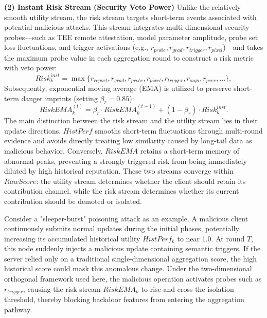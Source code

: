 \documentclass[runningheads,orivec]{llncs}
\begin{document}
\textbf{(2) Instant Risk Stream (Security Veto Power)}
Unlike the relatively smooth utility stream, the risk stream targets short-term events associated with potential malicious attacks. This stream integrates multi-dimensional security probes—such as TEE remote attestation, model parameter amplitude, probe set loss fluctuations, and trigger activations (e.g., $r_{probe}, r_{grad}, r_{trigger}, r_{pixel}$)—and takes the maximum probe value in each aggregation round to construct a risk metric with veto power:
\begin{equation}
    Risk_{k}^{inst} = \max\{r_{report}, r_{grad}, r_{probe}, r_{pixel}, r_{trigger}, r_{sign}, r_{peer}, \dots \},
\end{equation}
Subsequently, exponential moving average (EMA) is utilized to preserve short-term danger imprints (setting $\beta_r = 0.85$):
\begin{equation}
    RiskEMA_{k}^{(t)} = \beta_{r} \cdot RiskEMA_{k}^{(t-1)} + (1 - \beta_{r}) \cdot Risk_{k}^{inst}.
\end{equation}
The main distinction between the risk stream and the utility stream lies in their update directions. $HistPerf$ smooths short-term fluctuations through multi-round evidence and avoids directly treating low similarity caused by long-tail data as malicious behavior. Conversely, $RiskEMA$ retains a short-term memory of abnormal peaks, preventing a strongly triggered risk from being immediately diluted by high historical reputation. These two streams converge within $RawScore$: the utility stream determines whether the client should retain its contribution channel, while the risk stream determines whether its current contribution should be demoted or isolated.

Consider a "sleeper-burst" poisoning attack as an example. A malicious client continuously submits normal updates during the initial phases, potentially increasing its accumulated historical utility $HistPerf_k$ to near 1.0. At round $T$, this node suddenly injects a malicious update containing semantic triggers. If the server relied only on a traditional single-dimensional aggregation score, the high historical score could mask this anomalous change. Under the two-dimensional orthogonal framework used here, the malicious operation activates probes such as $r_{trigger}$, causing the risk stream $RiskEMA_k$ to rise and cross the isolation threshold, thereby blocking backdoor features from entering the aggregation pathway.
\end{document}
